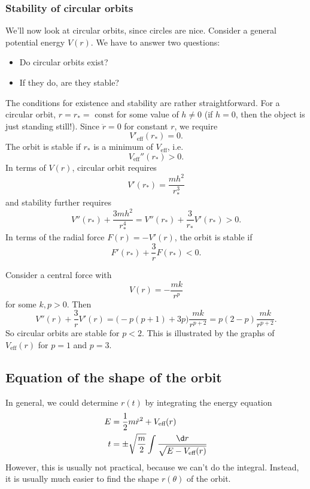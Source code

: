 \documentclass[a4paper]{article}
\begin{document}
\subsubsection*{Stability of circular orbits}
We'll now look at circular orbits, since circles are nice. Consider a general potential energy $V(r)$. We have to answer two questions:
\begin{itemize}
  \item Do circular orbits exist?
  \item If they do, are they stable?
\end{itemize}

The conditions for existence and stability are rather straightforward. For a circular orbit, $r = r_* =$ const for some value of $h\not= 0$ (if $h = 0$, then the object is just standing still!). Since $\ddot{r} = 0$ for constant $r$, we require
\[
  V'_{\text{eff}}(r_*) = 0.
\]
The orbit is stable if $r_*$ is a minimum of $V_{\text{eff}}$, i.e.
\[
  V_{\text{eff}}''(r_*) > 0.
\]
In terms of $V(r)$, circular orbit requires
\[
  V'(r_*) = \frac{mh^2}{r_*^3}
\]
and stability further requires
\[
  V''(r_*) + \frac{3mh^2}{r_*^4} = V''(r_*) + \frac{3}{r_*}V'(r_*) > 0.
\]
In terms of the radial force $F(r) = -V'(r)$, the orbit is stable if
\[
  F'(r_*) + \frac{3}{r}F(r_*) < 0.
\]
\begin{eg}
  Consider a central force with
  \[
    V(r) = -\frac{mk}{r^p}
  \]
  for some $k, p > 0$. Then
  \[
    V''(r) + \frac{3}{r}V'(r) = \big( -p(p + 1) + 3p\big)\frac{mk}{r^{p + 2}} = p(2-p)\frac{mk}{r^{p + 2}}.
  \]
  So circular orbits are stable for $p < 2$. This is illustrated by the graphs of $V_{\text{eff}}(r)$ for $p = 1$ and $p = 3$.
  \begin{center}
  \end{center}
\end{eg}

\subsection{Equation of the shape of the orbit}
In general, we could determine $r(t)$ by integrating the energy equation
\begin{align*}
  E &= \frac{1}{2}m\dot{r}^2 + V_{\text{eff}}(r)\\
  t &= \pm \sqrt{\frac{m}{2}}\int \frac{\d r}{\sqrt{E - V_{\text{eff}}(r)}}
\end{align*}
However, this is usually not practical, because we can't do the integral. Instead, it is usually much easier to find the shape $r(\theta)$ of the orbit.
\end{document}
